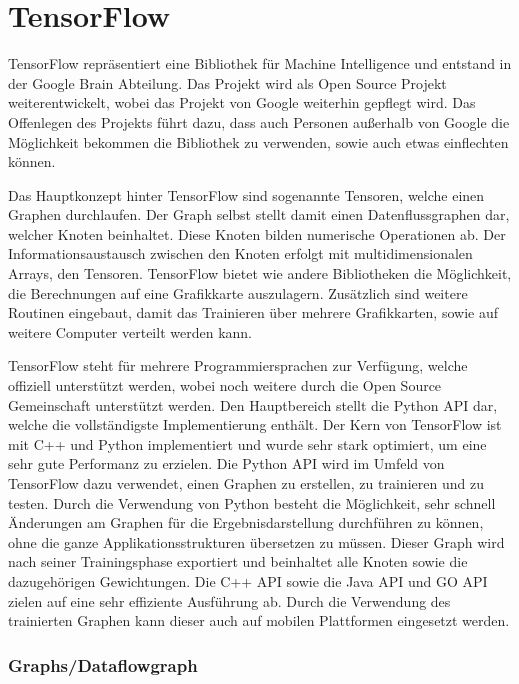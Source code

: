 \chapter{TensorFlow}
\label{cha:TensorFlow}

TensorFlow repräsentiert eine Bibliothek für Machine Intelligence und entstand in der Google Brain Abteilung.
Das Projekt wird als Open Source Projekt weiterentwickelt, wobei das Projekt von Google weiterhin gepflegt wird. 
Das Offenlegen des Projekts führt dazu, dass auch Personen außerhalb von Google die Möglichkeit bekommen die Bibliothek zu verwenden, sowie auch etwas einflechten können. \newline

\noindent
Das Hauptkonzept hinter TensorFlow sind sogenannte Tensoren, welche einen Graphen durchlaufen. 
Der Graph selbst stellt damit einen Datenflussgraphen dar, welcher Knoten beinhaltet. 
Diese Knoten bilden numerische Operationen ab.
Der Informationsaustausch zwischen den Knoten erfolgt mit multidimensionalen Arrays, den Tensoren.
TensorFlow bietet wie andere Bibliotheken die Möglichkeit, die Berechnungen auf eine Grafikkarte auszulagern.
Zusätzlich sind weitere Routinen eingebaut, damit das Trainieren über mehrere Grafikkarten, sowie auf weitere Computer verteilt werden kann. \newline

\noindent
TensorFlow steht für mehrere Programmiersprachen zur Verfügung, welche offiziell unterstützt werden, wobei noch weitere durch die Open Source Gemeinschaft unterstützt werden.
Den Hauptbereich stellt die Python API dar, welche die vollständigste Implementierung enthält. 
Der Kern von TensorFlow ist mit C++ und Python implementiert und wurde sehr stark optimiert, um eine sehr gute Performanz zu erzielen.
Die Python API wird im Umfeld von TensorFlow dazu verwendet, einen Graphen zu erstellen, zu trainieren und zu testen. 
Durch die Verwendung von Python besteht die Möglichkeit, sehr schnell Änderungen am Graphen für die Ergebnisdarstellung durchführen zu können, ohne die ganze Applikationsstrukturen übersetzen zu müssen. 
Dieser Graph wird nach seiner Trainingsphase exportiert und beinhaltet alle Knoten sowie die dazugehörigen Gewichtungen. 
Die C++ API sowie die Java API und GO API zielen auf eine sehr effiziente Ausführung ab.
Durch die Verwendung des trainierten Graphen kann dieser auch auf mobilen Plattformen eingesetzt werden.

\subsection{Graphs/Dataflowgraph}

